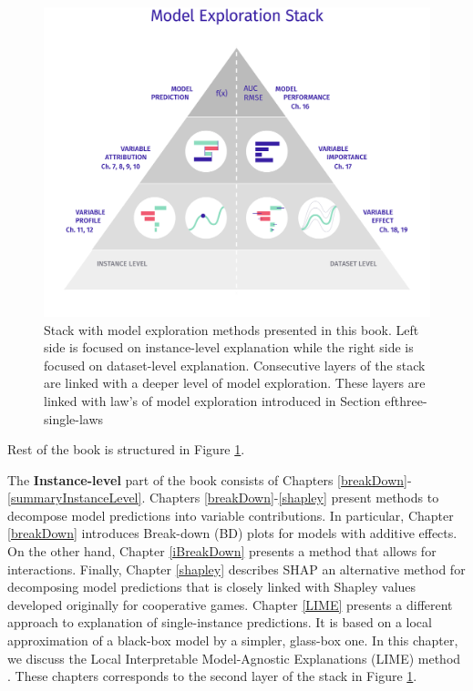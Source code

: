 \documentclass[12pt,]{krantz}
\begin{document}
\begin{figure}

{\centering \includegraphics[width=0.85\linewidth]{figure/UMEPpiramide} 

}

\caption{Stack with model exploration methods presented in this book. Left side is focused on instance-level explanation while the right side is focused on dataset-level explanation. Consecutive layers of the stack are linked with a deeper level of model exploration. These layers are linked with law's of model exploration introduced in Section 
ef{three-single-laws}}\label{fig:UMEPpiramide}
\end{figure}

Rest of the book is structured in Figure \ref{fig:UMEPpiramide}.

The \textbf{Instance-level} part of the book consists of Chapters \ref{breakDown}-\ref{summaryInstanceLevel}.
Chapters \ref{breakDown}-\ref{shapley} present methods to decompose model predictions into variable contributions. In particular, Chapter \ref{breakDown} introduces Break-down (BD) plots for models with additive effects. On the other hand, Chapter \ref{iBreakDown} presents a method that allows for interactions. Finally, Chapter \ref{shapley} describes SHAP \citep{SHAP} an alternative method for decomposing model predictions that is closely linked with Shapley values \citep{shapleybook1952} developed originally for cooperative games.
Chapter \ref{LIME} presents a different approach to explanation of single-instance predictions. It is based on a local approximation of a black-box model by a simpler, glass-box one. In this chapter, we discuss the Local Interpretable Model-Agnostic Explanations (LIME) method \citep{lime}. These chapters corresponds to the second layer of the stack in Figure \ref{fig:UMEPpiramide}.
\end{document}
